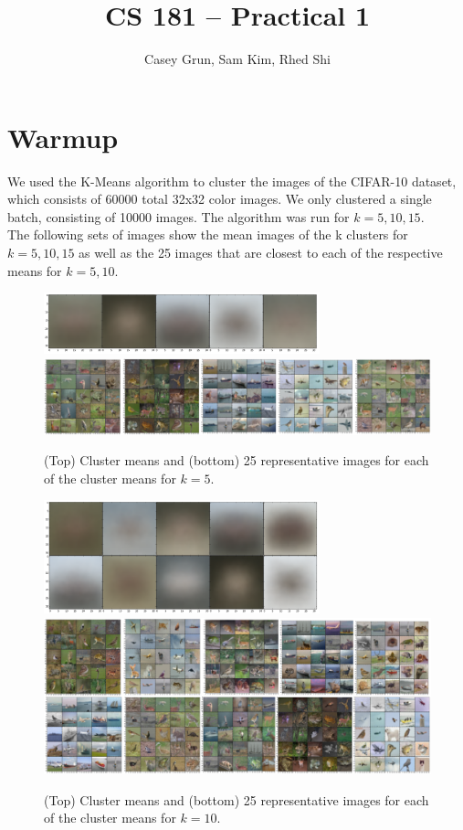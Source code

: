\documentclass[11pt]{amsart}
\title{CS 181 -- Practical 1}
\author{Casey Grun, Sam Kim, Rhed Shi}
\begin{document}
\maketitle

\section{Warmup}
We used the K-Means algorithm to cluster the images of the CIFAR-10 dataset, which consists of 60000 total 32x32 color images. We only clustered a single batch, consisting of 10000 images. The algorithm was run for $k=5,10,15$.\\
The following sets of images show the mean images of the k clusters for $k=5,10,15$ as well as the 25 images that are closest to each of the respective means for $k=5,10$.\\

\begin{figure}[h]
	\centering
	\includegraphics[width=8cm]{images/k5us.png}\\
	\includegraphics[width=15cm]{images/k5reps.png}\\
	\caption{(Top) Cluster means and (bottom) 25 representative images for each of the cluster means for $k=5$.}
\end{figure}

\begin{figure}[h]
	\centering
	\includegraphics[width=8cm]{images/k10us.png}\\
	\includegraphics[width=15cm]{images/k10reps.png}\\
	\caption{(Top) Cluster means and (bottom) 25 representative images for each of the cluster means for $k=10$.}
\end{figure}
\end{document}
